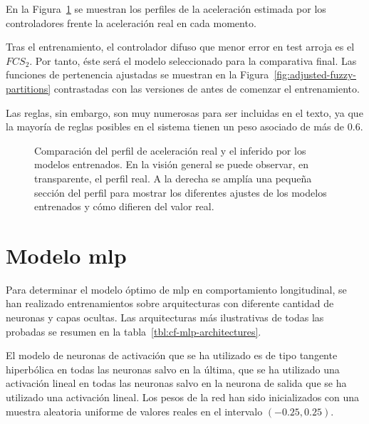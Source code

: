 En la Figura~\ref{fig:fcs-test-comparisons} se muestran los perfiles de la aceleración estimada por los controladores frente la aceleración real en cada momento. 

Tras el entrenamiento, el controlador difuso que menor error en test arroja es el $FCS_2$. Por tanto, éste será el modelo seleccionado para la comparativa final. Las funciones de pertenencia ajustadas se muestran en la Figura~\ref{fig:adjusted-fuzzy-partitions} contrastadas con las versiones de antes de comenzar el entrenamiento.

Las reglas, sin embargo, son muy numerosas para ser incluidas en el texto, ya que la mayoría de reglas posibles en el sistema tienen un peso asociado de más de $0.6$.

\begin{figure}[t]
	\centering
	\qquad
	\caption[Comparación del perfil de aceleración real y el inferido por los modelos entrenados]{Comparación del perfil de aceleración real y el inferido por los modelos entrenados. En la visión general se puede observar, en transparente, el perfil real. A la derecha se amplía una pequeña sección del perfil para mostrar los diferentes ajustes de los modelos entrenados y cómo difieren del valor real.}
	\label{fig:fcs-test-comparisons}
\end{figure}

\section{Modelo \ac{mlp}}

Para determinar el modelo óptimo de \ac{mlp} en comportamiento longitudinal, se han realizado entrenamientos sobre arquitecturas con diferente cantidad de neuronas y capas ocultas. Las arquitecturas más ilustrativas de todas las probadas se resumen en la tabla~\ref{tbl:cf-mlp-architectures}.

El modelo de neuronas de activación que se ha utilizado es de tipo tangente hiperbólica en todas las neuronas salvo en la última, que se ha utilizado una activación lineal en todas las neuronas salvo en la neurona de salida que se ha utilizado una activación lineal. Los pesos de la red han sido inicializados con una muestra aleatoria uniforme de valores reales en el intervalo $(-0.25, 0.25)$.

